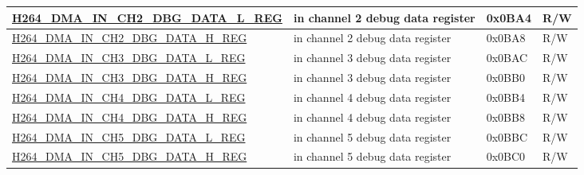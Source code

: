 \begin{longtable}{ | p{7.5cm} | p{5.7cm} | p{1.2cm} | p{1cm} | }
    \hyperref[regdesc:H264DMAINCH2DBGDATALREG]{H264\_DMA\_IN\_CH2\_DBG\_DATA\_L\_REG} & in channel 2 debug data register & 0x0BA4 & R/W \\ \hline
    \hyperref[regdesc:H264DMAINCH2DBGDATAHREG]{H264\_DMA\_IN\_CH2\_DBG\_DATA\_H\_REG} & in channel 2 debug data register & 0x0BA8 & R/W \\ \hline
    \hyperref[regdesc:H264DMAINCH3DBGDATALREG]{H264\_DMA\_IN\_CH3\_DBG\_DATA\_L\_REG} & in channel 3 debug data register & 0x0BAC & R/W \\ \hline
    \hyperref[regdesc:H264DMAINCH3DBGDATAHREG]{H264\_DMA\_IN\_CH3\_DBG\_DATA\_H\_REG} & in channel 3 debug data register & 0x0BB0 & R/W \\ \hline
    \hyperref[regdesc:H264DMAINCH4DBGDATALREG]{H264\_DMA\_IN\_CH4\_DBG\_DATA\_L\_REG} & in channel 4 debug data register & 0x0BB4 & R/W \\ \hline
    \hyperref[regdesc:H264DMAINCH4DBGDATAHREG]{H264\_DMA\_IN\_CH4\_DBG\_DATA\_H\_REG} & in channel 4 debug data register & 0x0BB8 & R/W \\ \hline
    \hyperref[regdesc:H264DMAINCH5DBGDATALREG]{H264\_DMA\_IN\_CH5\_DBG\_DATA\_L\_REG} & in channel 5 debug data register & 0x0BBC & R/W \\ \hline
    \hyperref[regdesc:H264DMAINCH5DBGDATAHREG]{H264\_DMA\_IN\_CH5\_DBG\_DATA\_H\_REG} & in channel 5 debug data register & 0x0BC0 & R/W \\ \hline
    

\end{longtable}
